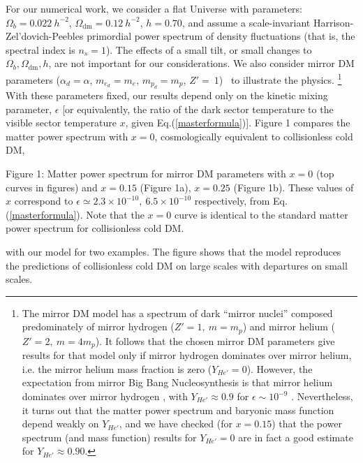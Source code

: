 \documentclass[12pt]{article}
\begin{document}
For our numerical work, we consider a flat Universe with parameters: $\Omega_b = 0.022 \ h^{-2}$,  $\Omega_{\text{dm}} = 0.12 \ h^{-2}$, $h = 0.70$, 
and assume a scale-invariant Harrison-Zel'dovich-Peebles primordial power spectrum of density fluctuations (that is, the spectral 
index is $n_s = 1$). 
The effects of a small tilt, or small changes to $\Omega_b, \Omega_{\text{dm}}, h$, are not important for  our 
considerations. We also consider mirror DM parameters ($\alpha_d = \alpha$, $m_{e_d} = m_e$, $m_{p_d} = m_p$, 
$Z' = \ 1$) \ to illustrate the 
physics.
\footnote{
The mirror DM model has a spectrum of dark ``mirror nuclei'' composed 
predominately of mirror hydrogen ($Z'=1,\ m=m_p$) and mirror helium ($Z'=2,\
m=4m_p$). 
It follows that the chosen mirror DM parameters give results for that
model only if mirror hydrogen dominates over mirror helium, i.e. the mirror helium mass fraction is zero ($Y_{He'} = 0$). 
However, the expectation from mirror Big Bang Nucleosynthesis
is that mirror helium dominates over mirror hydrogen \cite{ber1}, with $Y_{He'} \approx 0.9$ for $\epsilon \sim 10^{-9}$ \cite{fc}.
Nevertheless, it turns out that the matter power spectrum and baryonic mass function 
depend weakly on $Y_{He'}$, and we have checked (for $x=0.15$) that the power spectrum (and mass function) results for $Y_{He'}=0$ are in fact 
a good estimate for $Y_{He'} \approx 0.90$. 
}
With these parameters fixed, our results depend 
only on the kinetic mixing parameter, $\epsilon$ [or equivalently, the ratio 
of the dark sector temperature to the visible sector temperature $x$, given Eq.(\ref{masterformula})]. Figure 1 compares the 
matter power spectrum with $x=0$, cosmologically equivalent to collisionless cold DM, 

\centerline{}
\vskip 0.23cm
\centerline{}
\vskip 0.28cm
\noindent
{\small Figure 1: Matter power spectrum for mirror DM parameters with $x=0$ (top curves in figures) and 
$x=0.15$ (Figure 1a), $x=0.25$ (Figure 1b). These values of $x$ correspond to $\epsilon \simeq 2.3 \times 10^{-10}, \ 6.5 \times 10^{-10}$ respectively, 
from Eq.(\ref{masterformula}). Note that the $x=0$ curve is identical to the standard matter power spectrum for collisionless cold DM.}
\vskip 1.4cm



\noindent
with our model for two examples. The figure shows 
that the model reproduces the predictions of collisionless cold DM on large scales 
with 
departures on small scales.
\end{document}

